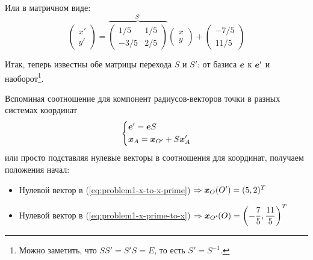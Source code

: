 \documentclass[a4paper,12pt]{article}
\begin{document}
\begin{solution}
    Или в матричном виде:
    \begin{equation}\label{eq:problem1-x-prime-to-x}
      \begin{pmatrix}
        x'\\
        y'
      \end{pmatrix}
      = \overbrace{\begin{pmatrix}
        1/5 & 1/5\\
        -3/5 & 2/5
      \end{pmatrix}}^{S'}
      \begin{pmatrix}
        x\\
        y
      \end{pmatrix}
      + \begin{pmatrix}
        -7/5\\
        11/5
      \end{pmatrix}
    \end{equation}
    
    Итак, теперь известны обе матрицы перехода $S$ и $S'$: от базиса $\boldsymbol e$ к $\boldsymbol e'$ и наоборот\footnote{Можно заметить, что $SS' = S'S = E$, то есть $S' = S^{-1}$.}.
    
    Вспоминая соотношение для компонент радиусов-векторов точки в разных системах координат
    \begin{equation*}
      \left\{
        \begin{aligned}
          &\boldsymbol e' = \boldsymbol e S\\
          &\boldsymbol x_A = \boldsymbol x_{O'} + S \boldsymbol x'_A
        \end{aligned}
      \right.
    \end{equation*}
    или просто подставляя нулевые векторы в соотношения для координат, получаем положения начал:
    \begin{itemize}
      \item Нулевой вектор в (\ref{eq:problem1-x-to-x-prime}) $\Rightarrow \boldsymbol x_O(O') = (5, 2)^T$
      \item Нулевой вектор в (\ref{eq:problem1-x-prime-to-x}) $\Rightarrow \boldsymbol x_{O'}(O) = \left(-\dfrac{7}{5}, \dfrac{11}{5}\right)^T$
    \end{itemize}
    

\end{solution}
\end{document}
